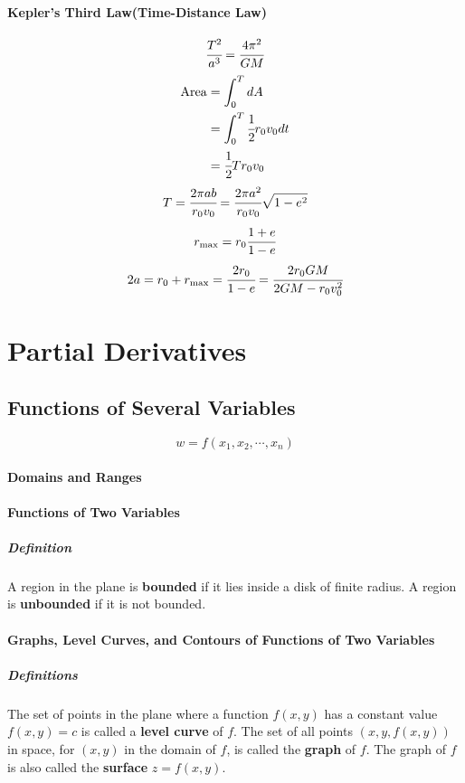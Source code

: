 \documentclass{article}
\begin{document}
            \paragraph{Kepler's Third Law(Time-Distance Law)}
                \[\cfrac{T^2}{a^3}=\cfrac{4\pi^2}{GM}\]
                \begin{equation}
                    \begin{aligned}
                        \text{Area}&=\int_0^TdA\\
                        &=\int_0^T\cfrac{1}{2}r_0v_0dt\\
                        &=\cfrac{1}{2}Tr_0v_0\\
                    \end{aligned}
                \end{equation}
                \[T=\cfrac{2\pi ab}{r_0v_0}=\cfrac{2\pi a^2}{r_0v_0}\sqrt{1-e^2}\]
                \[r_{\text{max}}=r_0\cfrac{1+e}{1-e}\]
                \[2a=r_0+r_{\text{max}}=\cfrac{2r_0}{1-e}=\cfrac{2r_0GM}{2GM-r_0v_0^2}\]
    
    \newpage
    \section{Partial Derivatives}
        \subsection{Functions of Several Variables}
            \[w=f(x_1,x_2,\cdots,x_n)\]
            \paragraph{Domains and Ranges}
            \paragraph{Functions of Two Variables}
                \subparagraph{Definition} A region in the plane is \textbf{bounded} if it lies inside a disk of finite radius. A region is \textbf{unbounded} if it is not bounded.
            \paragraph{Graphs, Level Curves, and Contours of Functions of Two Variables}
                \subparagraph{Definitions} The set of points in the plane where a function $f(x,y)$ has a constant value $f(x,y)=c$ is called a \textbf{level curve} of $f$. The set of all points $(x,y,f(x,y))$ in space, for $(x,y)$ in the domain of $f$, is called the \textbf{graph} of $f$. The graph of $f$ is also called the \textbf{surface} $z=f(x,y)$.
\end{document}

